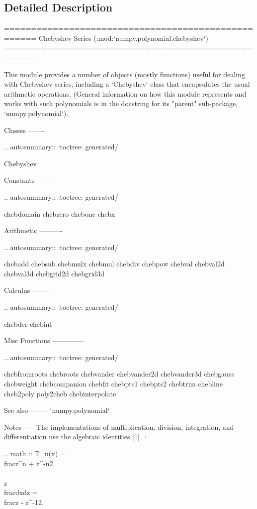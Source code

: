 \subsection{Detailed Description}
\begin{DoxyVerb}====================================================
Chebyshev Series (:mod:`numpy.polynomial.chebyshev`)
====================================================

This module provides a number of objects (mostly functions) useful for
dealing with Chebyshev series, including a `Chebyshev` class that
encapsulates the usual arithmetic operations.  (General information
on how this module represents and works with such polynomials is in the
docstring for its "parent" sub-package, `numpy.polynomial`).

Classes
-------

.. autosummary::
   :toctree: generated/

   Chebyshev


Constants
---------

.. autosummary::
   :toctree: generated/

   chebdomain
   chebzero
   chebone
   chebx

Arithmetic
----------

.. autosummary::
   :toctree: generated/

   chebadd
   chebsub
   chebmulx
   chebmul
   chebdiv
   chebpow
   chebval
   chebval2d
   chebval3d
   chebgrid2d
   chebgrid3d

Calculus
--------

.. autosummary::
   :toctree: generated/

   chebder
   chebint

Misc Functions
--------------

.. autosummary::
   :toctree: generated/

   chebfromroots
   chebroots
   chebvander
   chebvander2d
   chebvander3d
   chebgauss
   chebweight
   chebcompanion
   chebfit
   chebpts1
   chebpts2
   chebtrim
   chebline
   cheb2poly
   poly2cheb
   chebinterpolate

See also
--------
`numpy.polynomial`

Notes
-----
The implementations of multiplication, division, integration, and
differentiation use the algebraic identities [1]_:

.. math ::
    T_n(x) = \\frac{z^n + z^{-n}}{2} \\\\
    z\\frac{dx}{dz} = \\frac{z - z^{-1}}{2}.


\end{DoxyVerb}
